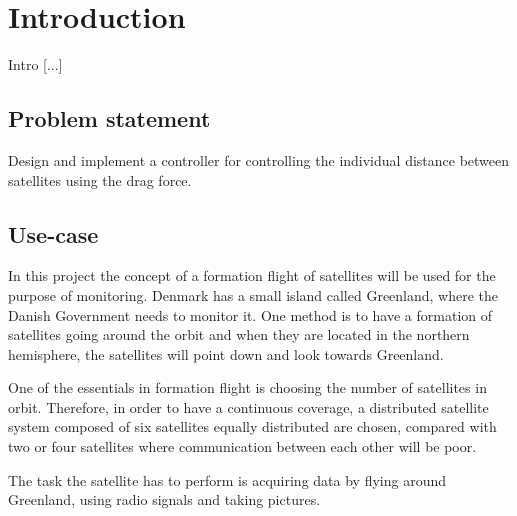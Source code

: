 \chapter{Introduction}\label{chap:Introduction}
\cite{Biezl}
Intro [...]

\section{Problem statement}
Design and implement a controller for controlling the individual distance between satellites using the drag force.
\section{Use-case}\label{sec:useCase}
In this project the concept of a formation flight of satellites will be used for the purpose of monitoring. Denmark has a small island called Greenland, where the Danish Government needs to monitor it. One method is to have a formation of satellites going around the orbit and when they are located in the northern hemisphere, the satellites will point down and look towards Greenland. 

One of the essentials in formation flight is choosing the number of satellites in orbit. Therefore, in order to have a continuous coverage, a distributed satellite system composed of six satellites equally distributed are chosen, compared with two or four satellites where communication between each other will be poor.

The task the satellite has to perform is acquiring data by flying around Greenland, using radio signals and taking pictures.

